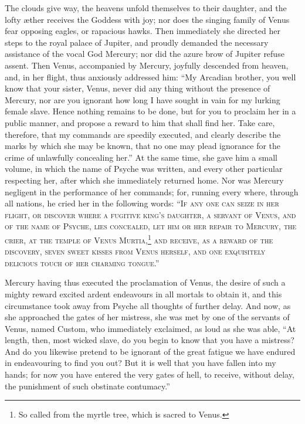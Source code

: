 \documentclass{article}
\begin{document}
The clouds give way, the heavens unfold themselves to their daughter, and the
lofty {\ae}ther receives the Goddess with joy; nor does the singing family of
Venus fear opposing eagles, or rapacious hawks. Then immediately she directed
her steps to the royal palace of Jupiter, and proudly demanded the necessary
assistance of the vocal God Mercury; nor did the azure brow of Jupiter refuse
assent. Then Venus, accompanied by Mercury, joyfully descended from heaven,
and, in her flight, thus anxiously addressed him: ``My Arcadian brother, you
well know that your sister, Venus, never did any thing without the presence of
Mercury, nor are you ignorant how long I have sought in vain for my lurking
female slave. Hence nothing remains to be done, but for you to proclaim her in
a public manner, and propose a reward to him that shall find her. Take care,
therefore, that my commands are speedily executed, and clearly describe the
marks by which she may be known, that no one may plead ignorance for the crime
of unlawfully concealing her.'' At the same time, she gave him a small volume,
in which the name of Psyche was written, and every other particular respecting
her, after which she immediately returned home. Nor was Mercury negligent in
the performance of her commands; for, running every where, through all nations,
he cried her in the following words: \textsc{``If any one can seize in her
flight, or discover where a fugitive king's daughter, a servant of Venus, and
of the name of Psyche, lies concealed, let him or her repair to Mercury, the
crier, at the temple of Venus Murtia,\footnote{So called from the myrtle tree,
which is sacred to Venus.} and receive, as a reward of the discovery, seven
sweet kisses from Venus herself, and one exquisitely delicious touch of her
charming tongue.''}

Mercury having thus executed the proclamation of Venus, the desire of such a
mighty reward excited ardent endeavours in all mortals to obtain it, and this
circumstance took away from Psyche all thoughts of further delay. And now, as
she approached the gates of her mistress, she was met by one of the servants of
Venus, named Custom, who immediately exclaimed, as loud as she was able, ``At
length, then, most wicked slave, do you begin to know that you have a mistress?
And do you likewise pretend to be ignorant of the great fatigue we have endured
in endeavouring to find you out? But it is well that you have fallen into my
hands; for now you have entered the very gates of hell, to receive, without
delay, the punishment of such obstinate contumacy.''
\end{document}
